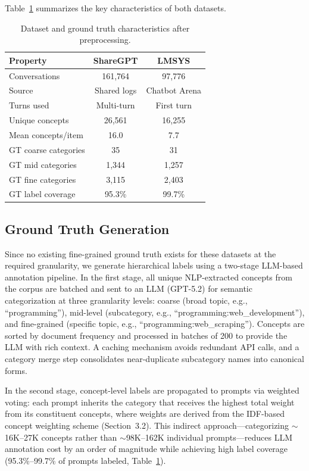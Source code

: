 \documentclass[conference]{IEEEtran}
\begin{document}
Table~\ref{tab:datasets} summarizes the key characteristics of both datasets.

\begin{table}[t]
\caption{Dataset and ground truth characteristics after preprocessing.}
\label{tab:datasets}
\centering
\small
\begin{tabular}{@{}lcc@{}}
\toprule
\textbf{Property} & \textbf{ShareGPT} & \textbf{LMSYS} \\
\midrule
Conversations & 161,764 & 97,776 \\
Source & Shared logs & Chatbot Arena \\
Turns used & Multi-turn & First turn \\
Unique concepts & 26,561 & 16,255 \\
Mean concepts/item & 16.0 & 7.7 \\
\midrule
GT coarse categories & 35 & 31 \\
GT mid categories & 1,344 & 1,257 \\
GT fine categories & 3,115 & 2,403 \\
GT label coverage & 95.3\% & 99.7\% \\
\bottomrule
\end{tabular}
\end{table}

\subsection{Ground Truth Generation}

Since no existing fine-grained ground truth exists for these datasets at the required granularity, we generate hierarchical labels using a two-stage LLM-based annotation pipeline. In the first stage, all unique NLP-extracted concepts from the corpus are batched and sent to an LLM (GPT-5.2) for semantic categorization at three granularity levels: coarse (broad topic, e.g., ``programming''), mid-level (subcategory, e.g., ``programming:web\_development''), and fine-grained (specific topic, e.g., ``programming:web\_scraping''). Concepts are sorted by document frequency and processed in batches of 200 to provide the LLM with rich context. A caching mechanism avoids redundant API calls, and a category merge step consolidates near-duplicate subcategory names into canonical forms.

In the second stage, concept-level labels are propagated to prompts via weighted voting: each prompt inherits the category that receives the highest total weight from its constituent concepts, where weights are derived from the IDF-based concept weighting scheme (Section~3.2). This indirect approach---categorizing $\sim$16K--27K concepts rather than $\sim$98K--162K individual prompts---reduces LLM annotation cost by an order of magnitude while achieving high label coverage (95.3\%--99.7\% of prompts labeled, Table~\ref{tab:datasets}).
\end{document}
